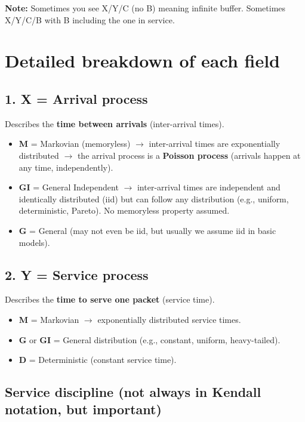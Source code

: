 \noindent
\textbf{Note:} Sometimes you see X/Y/C (no B) meaning infinite buffer.
Sometimes X/Y/C/B with B including the one in service.

\section*{Detailed breakdown of each field}

\subsection*{1. X = Arrival process}

Describes the \textbf{time between arrivals} (inter-arrival times).

\begin{itemize}
    \item \textbf{M} = Markovian (memoryless) \(\rightarrow\) inter-arrival times are exponentially distributed \(\rightarrow\) the arrival process is a \textbf{Poisson process} (arrivals happen at any time, independently).
    \item \textbf{GI} = General Independent \(\rightarrow\) inter-arrival times are independent and identically distributed (iid) but can follow any distribution (e.g., uniform, deterministic, Pareto). No memoryless property assumed.
    \item \textbf{G} = General (may not even be iid, but usually we assume iid in basic models).
\end{itemize}

\subsection*{2. Y = Service process}

Describes the \textbf{time to serve one packet} (service time).

\begin{itemize}
    \item \textbf{M} = Markovian \(\rightarrow\) exponentially distributed service times.
    \item \textbf{G} or \textbf{GI} = General distribution (e.g., constant, uniform, heavy-tailed).
    \item \textbf{D} = Deterministic (constant service time).
\end{itemize}

\subsection*{Service discipline (not always in Kendall notation, but important)}

